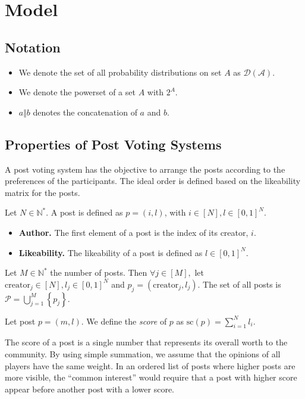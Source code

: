 \section{Model}
  \subsection{Notation}
    \begin{itemize}
      \item We denote the set of all probability distributions on set $A$ as
      $\mathcal{D\left(A\right)}$.
      \item We denote the powerset of a set $A$ with $2^A$.
      \item $a \Vert b$ denotes the concatenation of $a$ and $b$.
    \end{itemize}

  \subsection{Properties of Post Voting Systems}
    A post voting system has the objective to arrange the posts according to the
    preferences of the participants. The ideal order is defined based on the
    likeability matrix for the posts.

    \begin{definition}[Post]
      Let $N \in \mathbb{N}^*$. A post is defined as $p = \left(i, l\right)$,
      with $i \in \left[N\right], l \in \left[0, 1\right]^N$.
      \begin{itemize}
        \item \textbf{Author.} The first element of a post is the index of its
        creator, $i$.

        \item \textbf{Likeability.} The likeability of a post is defined as $l
        \in \left[0, 1\right]^N$.
      \end{itemize}
      Let $M \in \mathbb{N}^*$ the number of posts. Then $\forall j \in
      \left[M\right],$ let $\mathrm{creator}_j \in \left[N\right], l_j \in
      \left[0, 1\right]^N$ and $p_j = \left(\mathrm{creator}_j, l_j\right)$. The
      set of all posts is $\mathcal{P} = \bigcup\limits_{j=1}^M
      \left\{p_j\right\}$.
    \end{definition}

    \begin{definition}
      Let post $p = \left(m, l\right)$. We define the \emph{score} of $p$ as
      $\mathrm{sc}\left(p\right) = \sum\limits_{i = 1}^N l_i$.
    \end{definition}
    The score of a post is a single number that represents its overall worth to
    the community. By using simple summation, we assume that the opinions of all
    players have the same weight. In an ordered list of posts where higher posts
    are more visible, the ``common interest'' would require that a post with
    higher score appear before another post with a lower score.

